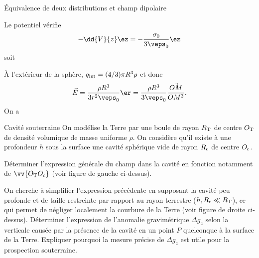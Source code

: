 \begin{exo}[PC][3]{Équivalence de deux distributions et champ dipolaire}
\begin{quest}
{Le potentiel vérifie
$$
-\dd{V}{z} \ez = -\frac{\sigma_0}{3\veps_0}\ez
$$
soit 
}

{
À l'extérieur de la sphère, $q_{\rm int} = (4/3)\pi R^3 \rho$ et donc
$$
\Vec{E} = \frac{\rho R^3}{3 r^2 \veps_0} \er = \frac{\rho R^3}{3\veps_0} \frac{\Vec{OM}}{OM^3}.
$$
On a
}
\end{quest}
\end{exo}


\begin{exo}[PC][1][TD]{Cavité souterraine}
On modélise la Terre par une boule de rayon $R_{\rm{T}}$ de centre $O_{\rm{T}}$ de densité volumique de masse uniforme $\rho$. On considère qu'il existe à une profondeur $h$ sous la surface une cavité sphérique vide de rayon $R_{\rm{c}}$ de centre $O_{\rm{c}}$.
\begin{quest}
\item Déterminer l'expression générale du champ dans la cavité en fonction notamment de $\vv{O_{\rm{T}}O_{\rm{c}}}$ (voir figure de gauche ci-dessus).
\item On cherche à simplifier l'expression précédente en supposant la cavité peu profonde et de taille restreinte par rapport au rayon terrestre ($h,R_{\rm{c}}\ll R_{\rm{T}}$), ce qui permet de négliger localement la courbure de la Terre (voir figure de droite ci-dessus). Déterminer l'expression de l'anomalie gravimétrique $\Delta g_z$ selon la verticale causée par la présence de la cavité en un point $P$ quelconque à la surface de la Terre. Expliquer pourquoi la mesure précise de $\Delta g_z$ est utile pour la prospection souterraine.
\end{quest}
\end{exo}

